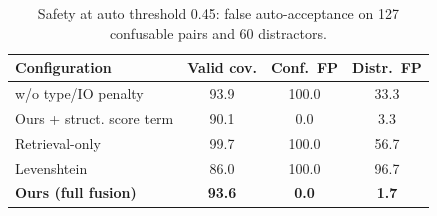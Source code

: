 \begin{table}[t]
\caption{Safety at auto threshold 0.45: false auto-acceptance on 127 confusable pairs and 60 distractors.}
\label{tab:safety}
\centering
\footnotesize
\setlength{\tabcolsep}{3.5pt}
\begin{tabular}{lccc}
\toprule
Configuration & Valid cov. & Conf.\ FP & Distr.\ FP \\
\midrule
w/o type/IO penalty & 93.9 & 100.0 & 33.3 \\
Ours + struct. score term & 90.1 & 0.0 & 3.3 \\
Retrieval-only & 99.7 & 100.0 & 56.7 \\
Levenshtein & 86.0 & 100.0 & 96.7 \\
\textbf{Ours (full fusion)} & \textbf{93.6} & \textbf{0.0} & \textbf{1.7} \\
\bottomrule
\end{tabular}
\end{table}
